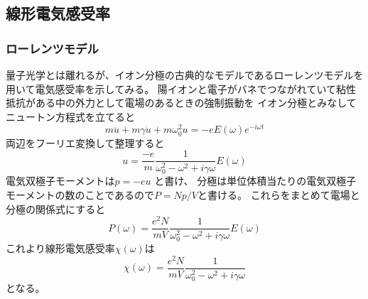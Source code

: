 \documentclass[11pt,dvipdfmx,a4paper]{jsarticle}
\begin{document}
\subsection{線形電気感受率}
\subsubsection{ローレンツモデル}
量子光学とは離れるが、イオン分極の古典的なモデルであるローレンツモデルを用いて電気感受率を示してみる。
陽イオンと電子がバネでつながれていて粘性抵抗がある中の外力として電場のあるときの強制振動を
イオン分極とみなしてニュートン方程式を立てると
\begin{equation}
	m\ddot{u} + m\gamma\dot{u} +m\omega_0^2 u = -eE(\omega)e^{-i\omega t}
\end{equation}
両辺をフーリエ変換して整理すると
\begin{equation}
	u = \frac{-e}{m}\frac{1}{\omega_0^2-\omega^2 + i\gamma\omega} E(\omega)
\end{equation}
電気双極子モーメントは\(p = - eu\) と書け、
分極は単位体積当たりの電気双極子モーメントの数のことであるので\(P = Np/V\)と書ける。
これらをまとめて電場と分極の関係式にすると
\begin{equation}
	P(\omega) = \frac{e^2N}{mV} \frac{1}{\omega_0^2-\omega^2+i\gamma\omega} E(\omega)
\end{equation}
これより線形電気感受率\(\chi(\omega)\)は
\begin{equation}
	\chi(\omega) = \frac{e^2N}{mV} \frac{1}{\omega_0^2-\omega^2+i\gamma\omega}
\end{equation}
となる。
\end{document}
